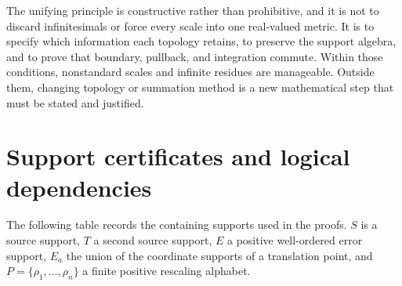 \documentclass[11pt,letterpaper]{article}
\theoremstyle{definition}
\theoremstyle{remark}
\numberwithin{equation}{section}
\begin{document}
The unifying principle is constructive rather than prohibitive, and it is not to
discard infinitesimals or force every scale into one real-valued metric. It is to
specify which information each topology retains, to preserve the support algebra,
and to prove that boundary, pullback, and integration commute. Within those
conditions, nonstandard scales and infinite residues are manageable. Outside them,
changing topology or summation method is a new mathematical step that must be stated
and justified.

\appendix

\section{Support certificates and logical dependencies}
\label{contours:app:support}

The following table records the containing supports used in the proofs. $S$ is a
source support, $T$ a second source support, $E$ a positive well-ordered error
support, $E_a$ the union of the coordinate supports of a translation point, and
$P=\{\rho_1,\ldots,\rho_n\}$ a finite positive rescaling alphabet.
\end{document}
